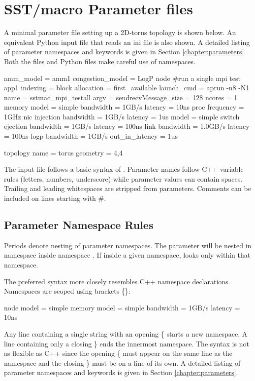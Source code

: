 
\section{SST/macro Parameter files}
\label{sec:parameters}
A minimal parameter file setting up a 2D-torus topology is shown below. 
An equivalent Python input file that reads an ini file is also shown.
A detailed listing of parameter namespaces and keywords is given in Section \ref{chapter:parameters}.
Both the  files and Python files make careful use of namespaces.

\begin{ViFile}
amm_model = amm1
congestion_model = LogP
node {
 #run a single mpi test
 app1 {
  indexing = block
  allocation = first_available
  launch_cmd = aprun -n8 -N1
  name = sstmac_mpi_testall
  argv =
  sendrecvMessage_size = 128
 }
 ncores = 1
 memory {
  model = simple
  bandwidth = 1GB/s
  latency = 10ns
 }
 proc {
  frequency = 1GHz
 }
 nic {
  injection {
   bandwidth = 1GB/s
   latency = 1us
  }
  model = simple
 }
}
switch {
 ejection {
  bandwidth = 1GB/s
  latency = 100ns
 }
 link {
  bandwidth = 1.0GB/s
   latency = 100ns
 }
 logp {
   bandwidth = 1GB/s
   out_in_latency = 1us
 }
}

topology {
 name = torus
 geometry = 4,4
}
\end{ViFile}
The input file follows a basic syntax of .  
Parameter names follow C++ variable rules (letters, numbers, underscore) while parameter values can contain spaces.  Trailing and leading whitespaces are stripped from parameters.
Comments can be included on lines starting with \#.

\subsection{Parameter Namespace Rules}
\label{subsec:parameterNamespace}
Periods denote nesting of parameter namespaces.
The parameter  will be nested in namespace  inside namespace .
If inside a given namespace, \sstmacro looks only within that namespace.

The preferred syntax more closely resembles C++ namespace declarations. 
Namespaces are scoped using brackets \{\}:

\begin{ViFile}
node {
 model = simple
 memory {
   model = simple
   bandwidth = 1GB/s
   latency = 10ns
 }
}
\end{ViFile}
Any line containing a single string with an opening \{ starts a new namespace.
A line containing only a closing \} ends the innermost namespace.
The syntax is not as flexible as C++ since the opening \{ must appear on the same line as the namespace and the closing \} must be on a line of its own.
A detailed listing of parameter namespaces and keywords is given in Section \ref{chapter:parameters}.

